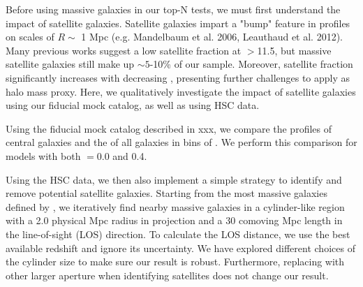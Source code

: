 \documentclass[a4paper,fleqn,usenatbib]{mnras}
\begin{document}
Before using massive galaxies in our top-N tests, we must first understand the impact of  satellite galaxies.        Satellite galaxies impart a "bump" feature in \dsigma{} profiles on scales of $R\sim$ 1 Mpc (e.g. Mandelbaum et al. 2006, Leauthaud et al. 2012).
            Many previous works suggest a low satellite fraction at \logms{}$>$11.5, but
            massive satellite galaxies still make up $\sim 5$-10\% of our sample.
            Moreover, satellite fraction significantly increases with decreasing \mstar{},
            presenting further challenges to apply \mstar{} as halo mass proxy. Here, we qualitatively investigate the impact of satellite galaxies using our fiducial mock catalog, as well as using HSC data. 
       
       Using the fiducial mock catalog described in xxx, we compare the \dsigma{} profiles of central galaxies and the \dsigma{} of all galaxies in bins of . We perform this comparison for models with both \sigmh{}$=0.0$ and 0.4.

        Using the HSC data, we then also implement a  simple strategy to identify and remove potential
            satellite galaxies.
            Starting from the most massive galaxies defined by \mmax{},
            we iteratively find nearby massive galaxies in a cylinder-like region with
            a 2.0 physical Mpc radius in projection and a 30 comoving Mpc length in the
            line-of-sight (LOS) direction.
            To calculate the LOS distance, we use the best available redshift and ignore
            its uncertainty. We have explored  different choices of the cylinder size to make sure
            our result is robust. Furthermore, replacing \mmax{} with other larger aperture \mstar{} when identifying satellites
            does not change our result.
        

\end{document}
